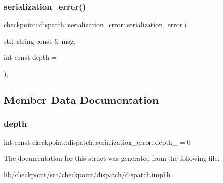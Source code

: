\subsubsection{\texorpdfstring{serialization\+\_\+error()}{serialization\_error()}}
{\footnotesize\ttfamily checkpoint\+::dispatch\+::serialization\+\_\+error\+::serialization\+\_\+error (\begin{DoxyParamCaption}\item[{std\+::string const \&}]{msg,  }\item[{int const}]{depth = {} }\end{DoxyParamCaption})\hspace{0.3cm}{\ttfamily [inline]}, {\ttfamily [explicit]}}



\subsection{Member Data Documentation}
\mbox{\label{structcheckpoint_1_1dispatch_1_1serialization__error_ada6ac0017a7af74ce56a6bf0f8c78260}} 
\subsubsection{\texorpdfstring{depth\+\_\+}{depth\_}}
{\footnotesize\ttfamily int const checkpoint\+::dispatch\+::serialization\+\_\+error\+::depth\+\_\+ = 0}



The documentation for this struct was generated from the following file\+:\begin{DoxyCompactItemize}
\item 
lib/checkpoint/src/checkpoint/dispatch/\hyperlink{lib_2checkpoint_2src_2checkpoint_2dispatch_2dispatch_8impl_8h}{dispatch.\+impl.\+h}\end{DoxyCompactItemize}
